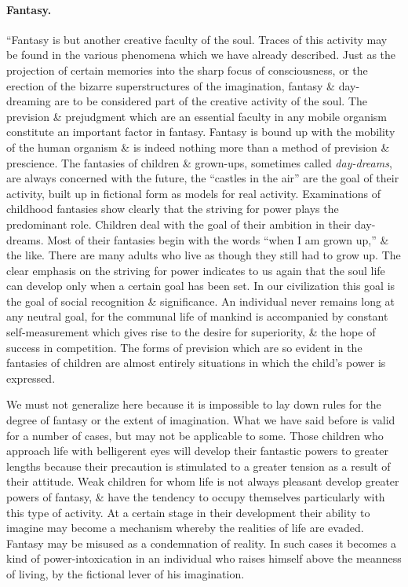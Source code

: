 \documentclass{article}
\begin{document}
\paragraph{Fantasy.} ``Fantasy is but another creative faculty of the soul. Traces of this activity may be found in the various phenomena which we have already described. Just as the projection of certain memories into the sharp focus of consciousness, or the erection of the bizarre superstructures of the imagination, fantasy \& day-dreaming are to be considered part of the creative activity of the soul. The prevision \& prejudgment which are an essential faculty in any mobile organism constitute an important factor in fantasy. Fantasy is bound up with the mobility of the human organism \& is indeed nothing more than a method of prevision \& prescience. The fantasies of children \& grown-ups, sometimes called {\it day-dreams}, are always concerned with the future, the ``castles in the air'' are the goal of their activity, built up in fictional form as models for real activity. Examinations of childhood fantasies show clearly that the striving for power plays the predominant role. Children deal with the goal of their ambition in their day-dreams. Most of their fantasies begin with the words ``when I am grown up,'' \& the like. There are many adults who live as though they still had to grow up. The clear emphasis on the striving for power indicates to us again that the soul life can develop only when a certain goal has been set. In our civilization this goal is the goal of social recognition \& significance. An individual never remains long at any neutral goal, for the communal life of mankind is accompanied by constant self-measurement which gives rise to the desire for superiority, \& the hope of success in competition. The forms of prevision which are so evident in the fantasies of children are almost entirely situations in which the child's power is expressed.

We must not generalize here because it is impossible to lay down rules for the degree of fantasy or the extent of imagination. What we have said before is valid for a number of cases, but may not be applicable to some. Those children who approach life with belligerent eyes will develop their fantastic powers to greater lengths because their precaution is stimulated to a greater tension as a result of their attitude. Weak children for whom life is not always pleasant develop greater powers of fantasy, \& have the tendency to occupy themselves particularly with this type of activity. At a certain stage in their development their ability to imagine may become a mechanism whereby the realities of life are evaded. Fantasy may be misused as a condemnation of reality. In such cases it becomes a kind of power-intoxication in an individual who raises himself above the meanness of living, by the fictional lever of his imagination.
\end{document}
